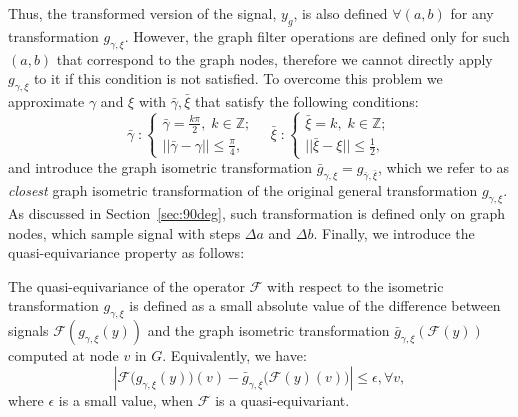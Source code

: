 \documentclass[10pt,journal,compsoc]{IEEEtran}
\newcommand{\renata}[1]{\textcolor{black}{#1}}
\newcommand{\mF}{\mathcal{F}}
\begin{document}
	Thus, the transformed version of the signal, $y_g$, is also defined $\forall (a,b)$ for any transformation $g_{\gamma,\xi}$. However, the graph filter operations are defined only for such $(a,b)$ that correspond to the graph nodes, therefore we cannot directly apply $g_{\gamma,\xi}$ to it if this condition is not satisfied. To overcome this problem we approximate $\gamma$ and $\xi$ with $\bar{\gamma}, \bar{\xi}$ that satisfy the following conditions:
	\begin{equation}
	\bar{\gamma} \; : 	
	\begin{cases}
	\bar{\gamma} = \frac{k\pi}{2},\; k \in \mathbb{Z}; \\
	||\bar{\gamma} - \gamma || \leq \frac{\pi}{4},
	\end{cases} \quad
	\bar{\xi} \; : 
	\begin{cases}
	\bar{\xi} = k,\; k \in \mathbb{Z}; \\
	||\bar{\xi} - \xi || \leq \frac{1}{2},
	\end{cases}
	\end{equation}
	\noindent
	and introduce the graph isometric transformation $\bar{g}_{\gamma, \xi} = g_{\bar{\gamma}, \bar{\xi}}$, which we refer to as \emph{closest} graph isometric transformation of the original general transformation $g_{\gamma, \xi}$.
	As discussed in Section~\ref{sec:90deg}, such transformation is defined only on graph nodes, which sample signal with steps $\Delta a$ and $\Delta b$. Finally, we introduce the quasi-equivariance property  as follows: 	
	\begin{mydef}
		The quasi-equivariance of the operator $\mF$ with respect to the isometric transformation $g_{\gamma,\xi}$ is defined as a small absolute value of the difference between signals $\mathcal{F}(g_{\gamma,\xi} (y))$ and the graph isometric transformation $\bar{g}_{\gamma,\xi}(\mathcal{F}(y))$ computed at node $v$ in $G$. Equivalently, we have:
		\begin{equation}
		\left| \mathcal{F}\big(g_{\gamma,\xi} (y)\big)(v) - \bar{g}_{\gamma,\xi} \big(\mathcal{F}(y)(v)\big) \right|  \leq \epsilon, \forall v,
		\label{eq:equivariance_ref}
		\end{equation}
		\noindent	
		where $\epsilon$ is a small value, when $\mathcal{F}$ is a quasi-equivariant.
	\end{mydef}
\end{document}
